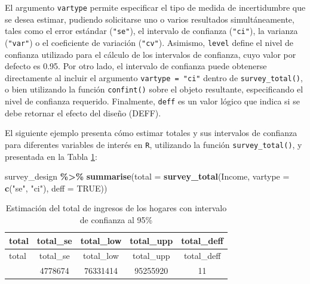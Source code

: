 \documentclass[
  spanish,
  12pt,
]{book}
\newenvironment{Shaded}{\begin{snugshade}}{\end{snugshade}}
\newcommand{\AttributeTok}[1]{\textcolor[rgb]{0.13,0.29,0.53}{#1}}
\newcommand{\ConstantTok}[1]{\textcolor[rgb]{0.56,0.35,0.01}{#1}}
\newcommand{\FunctionTok}[1]{\textcolor[rgb]{0.13,0.29,0.53}{\textbf{#1}}}
\newcommand{\NormalTok}[1]{#1}
\newcommand{\SpecialCharTok}[1]{\textcolor[rgb]{0.81,0.36,0.00}{\textbf{#1}}}
\newcommand{\StringTok}[1]{\textcolor[rgb]{0.31,0.60,0.02}{#1}}
\begin{document}
El argumento \texttt{vartype} permite especificar el tipo de medida de incertidumbre que se desea estimar, pudiendo solicitarse uno o varios resultados simultáneamente, tales como el error estándar (\texttt{"se"}), el intervalo de confianza (\texttt{"ci"}), la varianza (\texttt{"var"}) o el coeficiente de variación (\texttt{"cv"}). Asimismo, \texttt{level} define el nivel de confianza utilizado para el cálculo de los intervalos de confianza, cuyo valor por defecto es 0.95. Por otro lado, el intervalo de confianza puede obtenerse directamente al incluir el argumento \texttt{vartype\ =\ "ci"} dentro de \texttt{survey\_total()}, o bien utilizando la función \texttt{confint()} sobre el objeto resultante, especificando el nivel de confianza requerido. Finalmente, \texttt{deff} es un valor lógico que indica si se debe retornar el efecto del diseño (DEFF).

El siguiente ejemplo presenta cómo estimar totales y sus intervalos de confianza para diferentes variables de interés en \texttt{R}, utilizando la función \texttt{survey\_total()}, y presentada en la Tabla \ref{tab:tab-total-ingreso}:

\begin{Shaded}
\begin{Highlighting}[]
\NormalTok{survey\_design }\SpecialCharTok{\%\textgreater{}\%}
  \FunctionTok{summarise}\NormalTok{(}\AttributeTok{total =} \FunctionTok{survey\_total}\NormalTok{(Income, }\AttributeTok{vartype =} \FunctionTok{c}\NormalTok{(}\StringTok{"se"}\NormalTok{, }\StringTok{"ci"}\NormalTok{), }\AttributeTok{deff =} \ConstantTok{TRUE}\NormalTok{))}
\end{Highlighting}
\end{Shaded}

\begin{longtable}[]{@{}lcccc@{}}
\caption{\label{tab:tab-total-ingreso}Estimación del total de ingresos de los hogares con intervalo de confianza al 95\%}\tabularnewline
\toprule\noalign{}
total & total\_se & total\_low & total\_upp & total\_deff \\
\midrule\noalign{}
\endfirsthead
\toprule\noalign{}
total & total\_se & total\_low & total\_upp & total\_deff \\
\midrule\noalign{}
\endhead
\bottomrule\noalign{}
\endlastfoot
85793667 & 4778674 & 76331414 & 95255920 & 11 \\
\end{longtable}
\end{document}
